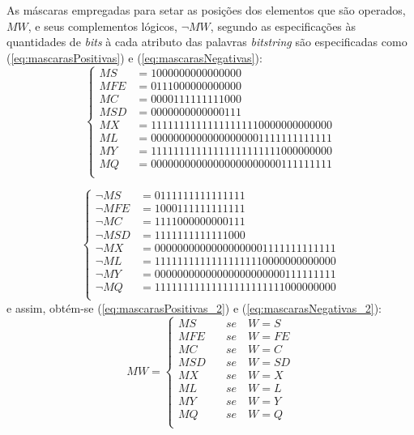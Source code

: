 As máscaras empregadas para setar as posições dos elementos que são operados, $MW$, e seus complementos lógicos, $\neg MW$, segundo as especificações às quantidades de \textit{bits} à cada atributo das palavras \textit{bitstring} são especificadas como (\ref{eq:mascarasPositivas}) e (\ref{eq:mascarasNegativas}):
\begin{equation}
 \begin{cases}
 MS  &= 1000000000000000 \\
 MFE &= 0111000000000000 \\
 MC  &= 0000111111111000 \\
 MSD &= 0000000000000111 \\
 
 MX  &= 11111111111111111110000000000000  \\
 ML  &= 00000000000000000001111111111111  \\
 
 MY  &= 11111111111111111111111000000000  \\
 MQ  &= 00000000000000000000000111111111  \\
 \end{cases}
 \label{eq:mascarasPositivas}
\end{equation}

\begin{equation}
 \begin{cases}
 \neg MS  &= 0111111111111111 \\
 \neg MFE &= 1000111111111111 \\
 \neg MC  &= 1111000000000111 \\
 \neg MSD &= 1111111111111000 \\
 
 \neg MX  &= 00000000000000000001111111111111  \\
 \neg ML  &= 11111111111111111110000000000000  \\
 
 \neg MY  &= 00000000000000000000000111111111  \\
 \neg MQ  &= 11111111111111111111111000000000  \\
 \end{cases}
 \label{eq:mascarasNegativas}
\end{equation}
e assim, obtém-se (\ref{eq:mascarasPositivas_2}) e (\ref{eq:mascarasNegativas_2}):
\begin{equation}
 MW= 
 \begin{cases}
 MS  \quad &se \quad W=S  \\
 MFE \quad &se \quad W=FE \\
 MC  \quad &se \quad W=C  \\
 MSD \quad &se \quad W=SD \\ 
 
 MX  \quad &se \quad W=X  \\
 ML  \quad &se \quad W=L  \\
 
 MY  \quad &se \quad W=Y  \\
 MQ  \quad &se \quad W=Q  \\
 \end{cases}
 \label{eq:mascarasPositivas_2}
\end{equation}

